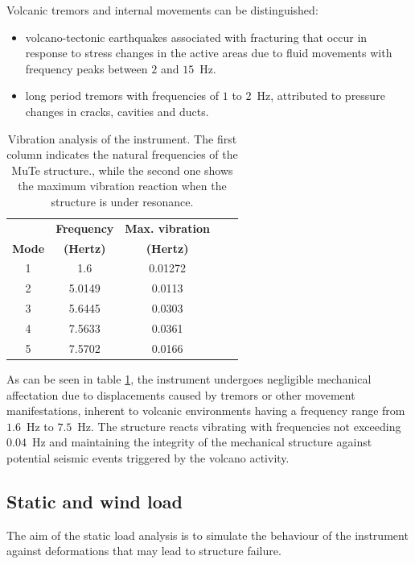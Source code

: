 \documentclass[letterpaper,11pt]{article}
\begin{document}
Volcanic tremors and internal movements can be distinguished\cite{mcnutt1992volcanic,londono2001spectral,langer2006automatic,chouet2003volcano}: 
\begin{itemize}
    \item volcano-tectonic earthquakes associated with fracturing that occur in response to stress changes in the active areas due to fluid movements with frequency peaks between $2$ and $15$~Hz.
    \item long period tremors with frequencies of $1$ to $2$~Hz, attributed to pressure changes in cracks, cavities and ducts. 
\end{itemize}
\begin{table}[htb]
\begin{center}
\begin{tabular}{ccccc}
\hline
& {\bf Frequency}  & {\bf Max. vibration}\\
{\bf Mode}  & {\bf (Hertz)}  & {\bf (Hertz)} \\
\hline
1 & 1.6 & 0.01272\\ 
2  & 5.0149  & 0.0113 \\
3  & 5.6445  & 0.0303 \\
4  & 7.5633  & 0.0361 \\
5  & 7.5702  & 0.0166 \\
\hline
\end{tabular}
\end{center}
\caption{Vibration analysis of the instrument. The first column indicates the natural frequencies of the MuTe structure., while the second one shows the maximum vibration reaction when the structure is under resonance.}
\label{Table_nat_frec1}
\end{table}

As can be seen in table \ref{Table_nat_frec1}, the instrument undergoes negligible mechanical affectation due to displacements caused by tremors or other movement manifestations, inherent to volcanic environments having a frequency range from $1.6$~Hz to $7.5$~Hz. The structure reacts vibrating with frequencies not exceeding $0.04$~Hz and maintaining the integrity of the mechanical structure against potential seismic events triggered by the volcano activity. 

\subsection{Static and wind load}
The aim of the static load analysis is to simulate the behaviour of the instrument against deformations that may lead to structure failure.
\end{document}
